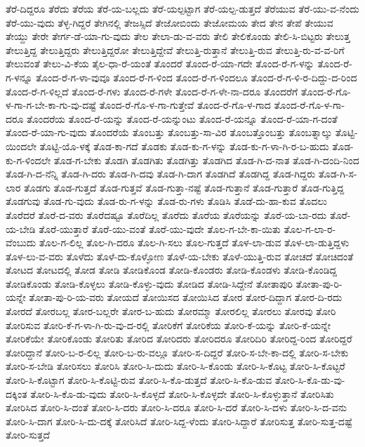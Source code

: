 {ತೆರೆ-ದಿದ್ದರೂ
ತೆರೆದು
ತೆರೆಯ
ತೆರೆ-ಯ-ಬಲ್ಲದು
ತೆರೆ-ಯಲ್ಪಟ್ಟಾಗ
ತೆರೆ-ಯಲ್ಪ-ಡುತ್ತದೆ
ತೆರೆಯುವ
ತೆರೆ-ಯು-ವ-ನೆಂದು
ತೆರೆ-ಯು-ವುದು
ತೆಳ್ಳ-ಗಿದ್ದರೆ
ತೇಗಿನಲ್ಲಿ
ತೇಜಸ್ಸಿದೆ
ತೇಜೋಬಿಂದು
ತೇಜೋಮಯ
ತೇದ
ತೇನ
ತೇಪೆ
ತೇಯುವ
ತೇಯ್ದು
ತೇರೇ
ತೇರ್ಗ-ಡೆ-ಯಾ-ಗು-ವುದು
ತೇಲ
ತೇಲಾ-ಡು-ವ-ವರು
ತೇಲಿ
ತೇಲಿಕೊಂಡು
ತೇಲಿ-ಸಿ-ಬಿಟ್ಟರು
ತೇಲುತ್ತ
ತೇಲುತ್ತಿದ್ದ
ತೇಲುತ್ತಿದ್ದರು
ತೇಲುತ್ತಿದ್ದರೋ
ತೇಲುತ್ತಿದ್ದೇವೆ
ತೇಲುತ್ತಿ-ರುತ್ತಾನೆ
ತೇಲುತ್ತಿ-ರುವ
ತೇಲುತ್ತಿ-ರು-ವ-ವ-ರಿಗೆ
ತೇಲುವಂತೆ
ತೇಲು-ವಿ-ಕೆಯ
ತೈಲ-ಧಾ-ರೆ-ಯಂತೆ
ತೊಂದರೆ
ತೊಂದ-ರೆ-ಯಾ-ಗದೇ
ತೊಂದ-ರೆ-ಗ-ಳನ್ನು
ತೊಂದ-ರೆ-ಗ-ಳನ್ನೂ
ತೊಂದ-ರೆ-ಗ-ಳಾ-ವುವೂ
ತೊಂದ-ರೆ-ಗ-ಳಿಂದ
ತೊಂದ-ರೆ-ಗ-ಳಿಂದಲೂ
ತೊಂದ-ರೆ-ಗ-ಳಿ-ರ-ದಿದ್ದು-ದ-ರಿಂದ
ತೊಂದ-ರೆ-ಗ-ಳಿಲ್ಲದೆ
ತೊಂದ-ರೆ-ಗಳು
ತೊಂದ-ರೆ-ಗಳೇ
ತೊಂದ-ರೆ-ಗ-ಳೇ-ನಾ-ದರೂ
ತೊಂದರೆಗೆ
ತೊಂದ-ರೆ-ಗೊ-ಳ-ಗಾ-ಗ-ಬೇ-ಕಾ-ಗು-ವು-ದಷ್ಟೆ
ತೊಂದ-ರೆ-ಗೊ-ಳ-ಗಾ-ಗುತ್ತೇವೆ
ತೊಂದ-ರೆ-ಗೊ-ಳ-ಗಾದ
ತೊಂದ-ರೆ-ಗೊ-ಳ-ಗಾ-ದರೂ
ತೊಂದರೆಯ
ತೊಂದ-ರೆ-ಯನ್ನು
ತೊಂದ-ರೆ-ಯನ್ನುಂಟು
ತೊಂದ-ರೆ-ಯನ್ನೂ
ತೊಂದ-ರೆ-ಯಾ-ಗ-ದಂತೆ
ತೊಂದ-ರೆ-ಯಾ-ಗು-ವುದು
ತೊಂದರೆಯೆ
ತೊಂಬತ್ತು
ತೊಂಬತ್ತು-ಸಾ-ವಿರ
ತೊಂಬತ್ತೊಂಬತ್ತು
ತೊಂಬತ್ನಾಲ್ಕು
ತೊಟ್ಟಿ-ಯಿಂದಲೇ
ತೊಟ್ಟಿ-ಯೊ-ಳಕ್ಕೆ
ತೊಡ-ಕಾ-ಗದೆ
ತೊಡಕು
ತೊಡ-ಕು-ಗ-ಳನ್ನು
ತೊಡ-ಕು-ಗ-ಳಾ-ಗಿ-ರ-ಬ-ಹುದು
ತೊಡ-ಕು-ಗ-ಳಿಂದಲೇ
ತೊಡ-ಗ-ಬೇಕು
ತೊಡಗಿ
ತೊಡಗಿತು
ತೊಡಗಿತ್ತು
ತೊಡಗಿದ
ತೊಡ-ಗಿ-ದ-ನಾತ
ತೊಡ-ಗಿ-ದಂದಿ-ನಿಂದ
ತೊಡ-ಗಿ-ದ-ನೆನ್ನಿ
ತೊಡ-ಗಿ-ದರು
ತೊಡ-ಗಿ-ದವು
ತೊಡ-ಗಿ-ದಾಗ
ತೊಡಗಿದೆ
ತೊಡಗಿದ್ದ
ತೊಡ-ಗಿದ್ದರು
ತೊಡ-ಗಿ-ಸ-ಲಾರ
ತೊಡಗು
ತೊಡ-ಗುತ್ತದೆ
ತೊಡ-ಗುತ್ತವೆ
ತೊಡ-ಗುತ್ತಾ-ನಷ್ಟೆ
ತೊಡ-ಗುತ್ತಾನೆ
ತೊಡ-ಗುತ್ತಾರೆ
ತೊಡ-ಗುತ್ತಿದ್ದ
ತೊಡಗುವು
ತೊಡ-ಗು-ವುದು
ತೊಡ-ರು-ಗ-ಳನ್ನು
ತೊಡ-ರು-ಗಳು
ತೊಡಿಸಿ
ತೊಡೆ-ದು-ಹಾ-ಕುವ
ತೊದಲು
ತೊರೆದರೆ
ತೊರೆ-ದ-ವರು
ತೊರೆದಷ್ಟೂ
ತೊರೆದಿಲ್ಲ
ತೊರೆದು
ತೊರೆಯ
ತೊರೆಯನ್ನು
ತೊರೆ-ಯ-ಬಾ-ರದು
ತೊರೆ-ಯ-ಬೇಡಿ
ತೊರೆ-ಯುತ್ತಾರೆ
ತೊರೆ-ಯು-ವಂತೆ
ತೊರೆ-ಯು-ವುದೇ
ತೊಲ-ಗ-ಬೇ-ಕಾ-ಯಿತು
ತೊಲ-ಗ-ಲಾ-ರ-ವೆಂಬುದು
ತೊಲ-ಗ-ಲಿಲ್ಲ
ತೊಲ-ಗಿ-ದರೂ
ತೊಲ-ಗಿ-ಸಲು
ತೊಲ-ಗುತ್ತದೆ
ತೊಳ-ಲಾ-ಡುವ
ತೊಳ-ಲಾ-ಡುತ್ತಿದ್ದಳು
ತೊಳ-ಲು-ವ-ವರು
ತೊಳೆದು
ತೊಳೆ-ದು-ಕೊಳ್ಳೋಣ
ತೊಳೆ-ಯ-ಬೇಕು
ತೊಳೆ-ಯುತ್ತಿ-ರುವ
ತೋಚದೆ
ತೋಚಿದಂತೆ
ತೋಟದ
ತೋಟದಲ್ಲಿ
ತೋಡ
ತೋಡಿ
ತೋಡಿಕೊಂಡ
ತೋಡಿ-ಕೊಂಡರು
ತೋಡಿ-ಕೊಂಡಳು
ತೋಡಿ-ಕೊಂಡಿದ್ದ
ತೋಡಿಕೊಂಡು
ತೋಡಿ-ಕೊಳ್ಳಲು
ತೋಡಿ-ಕೊಳ್ಳು-ವುದು
ತೋಡಿದ
ತೋಡಿ-ಸಿದ್ದೇನೆ
ತೋತಾಪುರಿ
ತೋತಾ-ಪು-ರಿ-ಯನ್ನೇ
ತೋತಾ-ಪು-ರಿ-ಯ-ವರು
ತೋಯದೆ
ತೋಯಿಸದ
ತೋಯಿಸಿದ
ತೋರ
ತೋರ-ದಿದ್ದಾಗ
ತೋರ-ದಿ-ರದು
ತೋರದೆ
ತೋರಬಲ್ಲ
ತೋರ-ಬಲ್ಲರೇ
ತೋರ-ಬ-ಹುದು
ತೋರಮ್ಮಾ
ತೋರಲಿಲ್ಲ
ತೋರಲು
ತೋರವು
ತೋರಿ
ತೋರಿಸುವ
ತೋರಿ-ಕೆ-ಗ-ಳಾ-ಗಿ-ರು-ವು-ದ-ರಲ್ಲಿ
ತೋರಿಕೆಗೆ
ತೋರಿಕೆಯ
ತೋರಿ-ಕೆ-ಯನ್ನು
ತೋರಿ-ಕೆ-ಯನ್ನೇ
ತೋರಿಕೆಯೇ
ತೋರಿಕೊಂಡು
ತೋರಿತು
ತೋರಿದ
ತೋರಿದರು
ತೋರಿದರೂ
ತೋರಿದಿರಿ
ತೋರಿದ್ದ-ರಿಂದ
ತೋರಿದ್ದರೆ
ತೋರಿದ್ದಾನೆ
ತೋರಿ-ಬ-ರ-ಲಿಲ್ಲ
ತೋರಿ-ಬ-ರು-ವಲ್ಲೂ
ತೋರಿ-ಸ-ದಿದ್ದರೆ
ತೋರಿ-ಸ-ಬೇ-ಕಾ-ದಲ್ಲಿ
ತೋರಿ-ಸ-ಬೇಕು
ತೋರಿ-ಸ-ಬೇಡಿ
ತೋರಿಸಲು
ತೋರಿಸಿ
ತೋರಿ-ಸಿ-ದುದು
ತೋರಿ-ಸಿ-ಕೊಂಡು
ತೋರಿ-ಸಿ-ಕೊಟ್ಟ
ತೋರಿ-ಸಿ-ಕೊಟ್ಟರೆ
ತೋರಿ-ಸಿ-ಕೊಟ್ಟಾಗ
ತೋರಿ-ಸಿ-ಕೊಟ್ಟಿ-ರುವ
ತೋರಿ-ಸಿ-ಕೊ-ಡುತ್ತದೆ
ತೋರಿ-ಸಿ-ಕೊ-ಡುವ
ತೋರಿ-ಸಿ-ಕೊ-ಡು-ವು-ದಕ್ಕಿಂತ
ತೋರಿ-ಸಿ-ಕೊ-ಡು-ವುದು
ತೋರಿ-ಸಿ-ಕೊಳ್ಳದೆ
ತೋರಿ-ಸಿ-ಕೊಳ್ಳದೇ
ತೋರಿ-ಸಿ-ಕೊಳ್ಳುತ್ತಾನೆ
ತೋರಿಸಿತು
ತೋರಿಸಿದ
ತೋರಿ-ಸಿ-ದಂತೆ
ತೋರಿ-ಸಿ-ದರು
ತೋರಿ-ಸಿ-ದರೂ
ತೋರಿ-ಸಿ-ದರೆ
ತೋರಿ-ಸಿ-ದಳು
ತೋರಿ-ಸಿ-ದ-ವನು
ತೋರಿ-ಸಿ-ದಾಗ
ತೋರಿ-ಸಿ-ದು-ದಕ್ಕೆ
ತೋರಿಸಿದೆ
ತೋರಿ-ಸಿದ್ದ-ಳೆಂದು
ತೋರಿ-ಸಿದ್ದಾರೆ
ತೋರಿಸುತ್ತ
ತೋರಿ-ಸುತ್ತ-ದಷ್ಟೆ
ತೋರಿ-ಸುತ್ತದೆ
}
